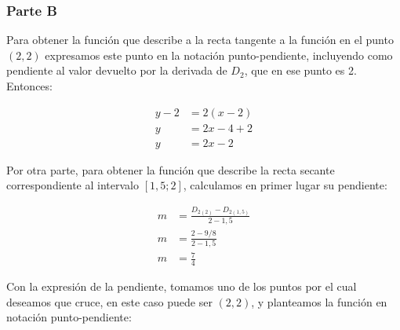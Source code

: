 \subsubsection*{Parte B}

\begin{center}
\end{center}

Para obtener la función que describe a la recta tangente a la función en el punto $(2, 2)$ expresamos este punto en la notación punto-pendiente, incluyendo como pendiente al valor devuelto por la derivada de $D_2$, que en ese punto es 2. Entonces:

\begin{align*}
    y-2 & = 2(x-2)     \\
    y   & = 2x - 4 + 2 \\
    y   & = 2x - 2
\end{align*}

Por otra parte, para obtener la función que describe la recta secante correspondiente al intervalo $[1,5; 2]$, calculamos en primer lugar su pendiente:

\begin{align*}
    m & = \frac{D_{2(2)} - D_{2(1,5)}}{2 - 1,5} \\
    m & = \frac{2 - 9/8}{2 - 1,5}               \\
    m & = \frac{7}{4}
\end{align*}

Con la expresión de la pendiente, tomamos uno de los puntos por el cual deseamos que cruce, en este caso puede ser $(2, 2)$, y planteamos la función en notación punto-pendiente:

